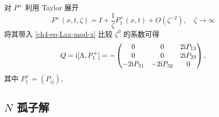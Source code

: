 对 $P^{+}$ 利用 Taylor 展开
\begin{equation}
    P^{+}(x,t,\zeta) = I + \frac{1}{\zeta} P_{1}^{+}(x,t) + O(\zeta^{-2}), \quad \zeta \to \infty
\end{equation}
将其带入 \eqref{ch4-eq-Lax-mod-x} 比较 $\zeta^{0}$ 的系数可得
\begin{equation}
    Q = \mathrm{i} [\Lambda, P_{1}^{+}] = - \begin{pmatrix}
        0 & 0 & 2 \mathrm{i} P_{13} \\ 0 & 0 & 2 \mathrm{i} P_{23} \\ -2 \mathrm{i} P_{31} & -2 \mathrm{i} P_{32} & 0
    \end{pmatrix}, \label{ch4-eq-Q-from-P1}
\end{equation}
其中 $ P_{1}^{+} = \left(P_{ij}\right) $,

\subsection{$N$ 孤子解}

